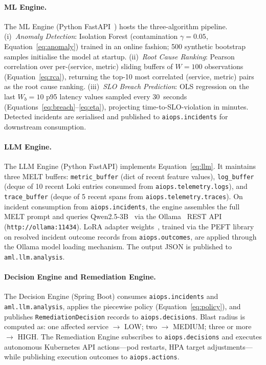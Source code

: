 \documentclass[a4paper,anonymous,UKenglish]{lipics-v2021}
\begin{document}
\paragraph*{ML Engine.}
The ML Engine (Python FastAPI~\cite{fastapi2018}) hosts the three-algorithm
pipeline. (i)~\textit{Anomaly Detection}: Isolation Forest (contamination
$\gamma{=}0.05$, Equation~\ref{eq:anomaly}) trained in an online fashion; 500
synthetic bootstrap samples initialise the model at startup.
(ii)~\textit{Root Cause Ranking}: Pearson correlation over per-(service, metric)
sliding buffers of $W{=}100$ observations (Equation~\ref{eq:rca}), returning
the top-10 most correlated (service, metric) pairs as the root cause ranking.
(iii)~\textit{SLO Breach Prediction}: OLS regression on the last $W_b{=}10$
p95 latency values sampled every 30~seconds
(Equations~\ref{eq:breach}--\ref{eq:eta}), projecting time-to-SLO-violation
in minutes. Detected incidents are serialised and published to
\texttt{aiops.incidents} for downstream consumption.

\paragraph*{LLM Engine.}
The LLM Engine (Python FastAPI) implements Equation~\ref{eq:llm}. It maintains
three MELT buffers: \texttt{metric\_buffer} (dict of recent feature values),
\texttt{log\_buffer} (deque of 10 recent Loki entries consumed from
\texttt{aiops.telemetry.logs}), and \texttt{trace\_buffer} (deque of 5 recent
spans from \texttt{aiops.telemetry.traces}). On incident consumption from
\texttt{aiops.incidents}, the engine assembles the full MELT prompt and queries
Qwen2.5-3B~\cite{qwen2024} via the Ollama~\cite{ollama2023} REST API
(\texttt{http://ollama:11434}). LoRA adapter weights~\cite{hu2022lora}, trained
via the PEFT library~\cite{peft2022} on resolved incident outcome records from
\texttt{aiops.outcomes}, are applied through the Ollama model loading mechanism.
The output JSON is published to \texttt{aml.llm.analysis}.

\paragraph*{Decision Engine and Remediation Engine.}
The Decision Engine (Spring Boot) consumes \texttt{aiops.incidents} and
\texttt{aml.llm.analysis}, applies the piecewise policy
(Equation~\ref{eq:policy}), and publishes \texttt{RemediationDecision} records
to \texttt{aiops.decisions}. Blast radius is computed as: one affected service
$\to$ LOW; two $\to$ MEDIUM; three or more $\to$ HIGH. The Remediation Engine
subscribes to \texttt{aiops.decisions} and executes autonomous Kubernetes API
actions---pod restarts, HPA target adjustments---while publishing execution
outcomes to \texttt{aiops.actions}.
\end{document}
